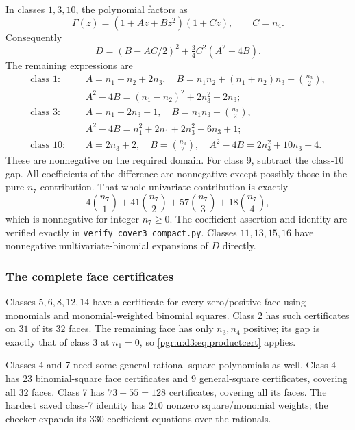 \documentclass[11pt]{article}
\numberwithin{equation}{section}
\theoremstyle{definition}\newtheorem{definition}[theorem]{Definition}\newtheorem{remark}[theorem]{Remark}
\newcommand{\Ga}{\Gamma}                   %
\begin{document}
In classes $1,3,10$, the polynomial factors as
\[
 \Ga(z)=(1+Az+Bz^2)(1+Cz),\qquad C=n_4.
\]
Consequently
\begin{equation}\label{pgr:u:d3:eq:productcert}
 D=(B-AC/2)^2+\tfrac34 C^2(A^2-4B).
\end{equation}
The remaining expressions are
\begin{align*}
\text{class 1: }\quad
&A=n_1+n_2+2n_3,\quad
B=n_1n_2+(n_1+n_2)n_3+\binom{n_3}{2},\\
&A^2-4B=(n_1-n_2)^2+2n_3^2+2n_3;\\[2pt]
\text{class 3: }\quad
&A=n_1+2n_3+1,\quad B=n_1n_3+\binom{n_3}{2},\\
&A^2-4B=n_1^2+2n_1+2n_3^2+6n_3+1;\\[2pt]
\text{class 10: }\quad
&A=2n_3+2,\quad B=\binom{n_3}{2},\quad
A^2-4B=2n_3^2+10n_3+4.
\end{align*}
These are nonnegative on the required domain. For class 9, subtract the class-10 gap. All coefficients of the difference are nonnegative except possibly those in the pure $n_7$ contribution. That whole univariate contribution is exactly
\begin{equation}\label{pgr:u:d3:eq:class9}
 4\binom{n_7}{1}+41\binom{n_7}{2}
 +57\binom{n_7}{3}+18\binom{n_7}{4},
\end{equation}
which is nonnegative for integer $n_7\ge0$. The coefficient assertion and identity are verified exactly in \texttt{verify\_cover3\_compact.py}. Classes $11,13,15,16$ have nonnegative multivariate-binomial expansions of $D$ directly.

\subsubsection{The complete face certificates}

Classes $5,6,8,12,14$ have a certificate for every zero/positive face using monomials and monomial-weighted binomial squares. Class 2 has such certificates on $31$ of its $32$ faces. The remaining face has only $n_3,n_4$ positive; its gap is exactly that of class 3 at $n_1=0$, so \eqref{pgr:u:d3:eq:productcert} applies.

Classes 4 and 7 need some general rational square polynomials as well. Class 4 has $23$ binomial-square face certificates and $9$ general-square certificates, covering all $32$ faces. Class 7 has $73+55=128$ certificates, covering all its faces. The hardest saved class-7 identity has $210$ nonzero square/monomial weights; the checker expands its $330$ coefficient equations over the rationals.
\end{document}
